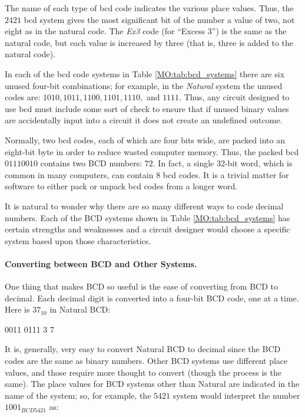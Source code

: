 The name of each type of \gls{bcd} code indicates the various place values. Thus, the $ 2421 $ \gls{bcd} system gives the most significant bit of the number a value of two, not eight as in the natural code. The \emph{Ex3} code (for ``Excess 3'') is the same as the natural code, but each value is increased by three (that is, three is added to the natural code). 

In each of the \gls{bcd} code systems in Table \ref{MO:tab:bcd_systems} there are six unused four-bit combinations; for example, in the \emph{Natural} system the unused codes are: $ 1010, 1011, 1100, 1101, 1110, $ and $ 1111 $. Thus, any circuit designed to use \gls{bcd} must include some sort of check to ensure that if unused binary values are accidentally input into a circuit it does not create an undefined outcome.

Normally, two \gls{bcd} codes, each of which are four bits wide, are packed into an eight-bit byte in order to reduce wasted computer memory. Thus, the packed \gls{bcd} $ 0111 0010 $ contains two BCD numbers: $ 72 $. In fact, a single 32-bit word, which is common in many computers, can contain $ 8 $ \gls{bcd} codes. It is a trivial matter for software to either pack or unpack \gls{bcd} codes from a longer word.

It is natural to wonder why there are so many different ways to code decimal numbers. Each of the \ac{BCD} systems shown in Table \ref{MO:tab:bcd_systems} has certain strengths and weaknesses and a circuit designer would choose a specific system based upon those characteristics.

\paragraph{Converting between BCD and Other Systems.} One thing that makes \ac{BCD} so useful is the ease of converting from \ac{BCD} to decimal. Each decimal digit is converted into a four-bit \ac{BCD} code, one at a time. Here is $ 37_{10} $ in Natural \ac{BCD}:

\begin{binDisp}
     0011 0111
       3    7
\end{binDisp}

It is, generally, very easy to convert Natural \ac{BCD} to decimal since the \ac{BCD} codes are the same as binary numbers. Other \ac{BCD} systems use different place values, and those require more thought to convert (though the process is the same). The place values for \ac{BCD} systems other than Natural are indicated in the name of the system; so, for example, the $ 5421 $ system would interpret the number $ 1001_{BCD5421} $ as:

